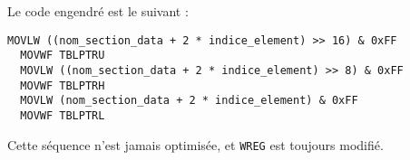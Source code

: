 Le code engendré est le suivant :
\begin{lstlisting}[language=assembleur]
  MOVLW ((nom_section_data + 2 * indice_element) >> 16) & 0xFF
  MOVWF TBLPTRU
  MOVLW ((nom_section_data + 2 * indice_element) >> 8) & 0xFF
  MOVWF TBLPTRH
  MOVLW (nom_section_data + 2 * indice_element) & 0xFF
  MOVWF TBLPTRL
\end{lstlisting}

Cette séquence n'est jamais optimisée, et \texttt{WREG} est toujours modifié.




